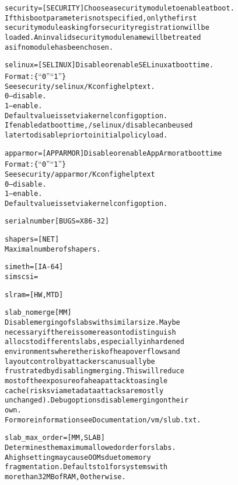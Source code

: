 \documentclass[a4paper,8pt,english]{sphinxmanual}
\begin{document}
\begin{alltt}
        security=       {[}SECURITY{]} Choose a security module to enable at boot.
                        If this boot parameter is not specified, only the first
                        security module asking for security registration will be
                        loaded. An invalid security module name will be treated
                        as if no module has been chosen.

        selinux=        {[}SELINUX{]} Disable or enable SELinux at boot time.
                        Format: \{ ``0'' \textbar{} ``1'' \}
                        See security/selinux/Kconfig help text.
                        0 -- disable.
                        1 -- enable.
                        Default value is set via kernel config option.
                        If enabled at boot time, /selinux/disable can be used
                        later to disable prior to initial policy load.

        apparmor=       {[}APPARMOR{]} Disable or enable AppArmor at boot time
                        Format: \{ ``0'' \textbar{} ``1'' \}
                        See security/apparmor/Kconfig help text
                        0 -- disable.
                        1 -- enable.
                        Default value is set via kernel config option.

        serialnumber    {[}BUGS=X86-32{]}

        shapers=        {[}NET{]}
                        Maximal number of shapers.

        simeth=         {[}IA-64{]}
        simscsi=

        slram=          {[}HW,MTD{]}

        slab\_nomerge    {[}MM{]}
                        Disable merging of slabs with similar size. May be
                        necessary if there is some reason to distinguish
                        allocs to different slabs, especially in hardened
                        environments where the risk of heap overflows and
                        layout control by attackers can usually be
                        frustrated by disabling merging. This will reduce
                        most of the exposure of a heap attack to a single
                        cache (risks via metadata attacks are mostly
                        unchanged). Debug options disable merging on their
                        own.
                        For more information see Documentation/vm/slub.txt.

        slab\_max\_order= {[}MM, SLAB{]}
                        Determines the maximum allowed order for slabs.
                        A high setting may cause OOMs due to memory
                        fragmentation.  Defaults to 1 for systems with
                        more than 32MB of RAM, 0 otherwise.


\end{alltt}
\end{document}
